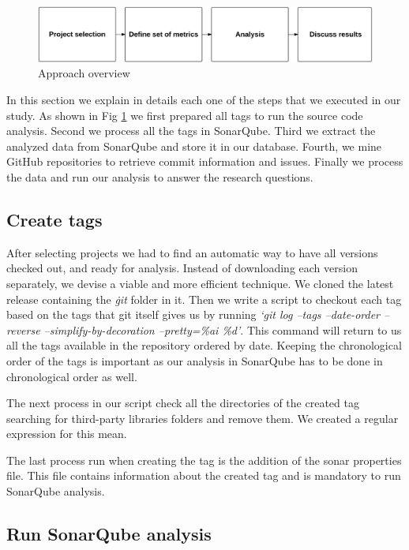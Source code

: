 
\begin{figure}[!hbt]
    \caption{Approach overview}
    \centering
    \label{fig:approach_overview}
    \includegraphics[width=1\textwidth]{figures/approach_overview}
 \end{figure}


In this section we explain in details each one of the steps that we executed in our study. As shown in Fig \ref{fig:approach_overview} we first prepared all tags to run the source code analysis. Second we process all the tags in SonarQube. Third we extract the analyzed data from SonarQube and store it in our database. Fourth, we mine GitHub repositories to retrieve commit information and issues. Finally we process the data and run our analysis to answer the research questions.  
 
\subsection{Create tags}

After selecting projects we had to find an automatic way to have all versions checked out, and ready for analysis. Instead of downloading each version separately, we devise a viable and more efficient technique. We cloned the latest release containing the \textit{\.git} folder in it. Then we write a script to checkout each tag based on the tags that git itself gives us by running \textit{`git log --tags --date-order --reverse --simplify-by-decoration --pretty=\%ai \%d'}. This command will return to us all the tags available in the repository ordered by date. Keeping the chronological order of the tags is important as our analysis in SonarQube has to be done in chronological order as well. 

The next process in our script check all the directories of the created tag searching for third-party libraries folders and remove them. We created a regular expression for this mean. 

The last process run when creating the tag is the addition of the sonar properties file. This file contains information about the created tag and is mandatory to run SonarQube analysis.


\subsection{Run SonarQube analysis}

